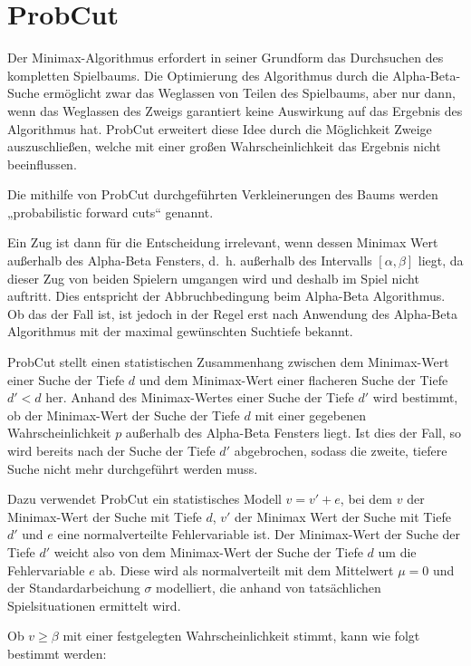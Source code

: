 \section{ProbCut}
\label{sec:probcut}

Der Minimax-Algorithmus erfordert in seiner Grundform das Durchsuchen des kompletten Spielbaums. Die Optimierung des
Algorithmus durch die Alpha-Beta-Suche ermöglicht zwar das Weglassen von Teilen des Spielbaums, aber nur dann, wenn das
Weglassen des Zweigs garantiert keine Auswirkung auf das Ergebnis des Algorithmus hat. ProbCut erweitert diese Idee
durch die Möglichkeit Zweige auszuschließen, welche mit einer großen Wahrscheinlichkeit das Ergebnis nicht beeinflussen.

Die mithilfe von ProbCut durchgeführten Verkleinerungen des Baums werden „probabilistic forward cuts“ genannt.

Ein Zug ist dann für die Entscheidung irrelevant, wenn dessen Minimax Wert außerhalb des Alpha-Beta Fensters, d. h.
außerhalb des Intervalls \([\alpha,\beta]\) liegt, da dieser Zug von beiden Spielern umgangen wird und deshalb im Spiel
nicht auftritt. Dies entspricht der Abbruchbedingung beim Alpha-Beta Algorithmus. Ob das der Fall ist, ist jedoch in der
Regel erst nach Anwendung des Alpha-Beta Algorithmus mit der maximal gewünschten Suchtiefe bekannt.

ProbCut stellt einen statistischen Zusammenhang zwischen dem Minimax-Wert einer Suche der Tiefe \(d\) und dem
Minimax-Wert einer flacheren Suche der Tiefe \(d'<d\) her. Anhand des Minimax-Wertes einer Suche der Tiefe \(d'\) wird
bestimmt, ob der Minimax-Wert der Suche der Tiefe \(d\) mit einer gegebenen Wahrscheinlichkeit \(p\) außerhalb des
Alpha-Beta Fensters liegt. Ist dies der Fall, so wird bereits nach der Suche der Tiefe \(d'\) abgebrochen, sodass die
zweite, tiefere Suche nicht mehr durchgeführt werden muss.

Dazu verwendet ProbCut ein statistisches Modell \(v=v'+e\), bei dem \(v\) der Minimax-Wert der Suche mit Tiefe \(d\),
\(v'\) der Minimax Wert der Suche mit Tiefe \(d'\) und \(e\) eine normalverteilte Fehlervariable ist. Der Minimax-Wert
der Suche der Tiefe \(d'\) weicht also von dem Minimax-Wert der Suche der Tiefe \(d\) um die Fehlervariable \(e\) ab.
Diese wird als normalverteilt mit dem Mittelwert $\mu=0$ und der Standardarbeichung \(\sigma\) modelliert, die anhand
von tatsächlichen Spielsituationen ermittelt wird.

Ob $v\geq\beta$ mit einer festgelegten Wahrscheinlichkeit stimmt, kann wie folgt bestimmt werden:

